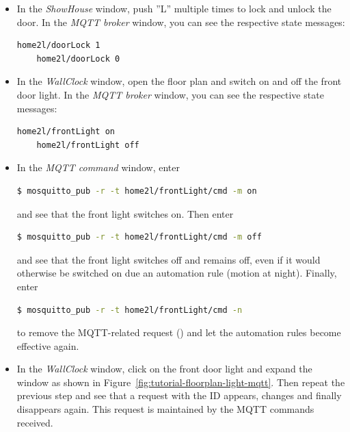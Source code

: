 \documentclass[12pt,english,parskip=half,headheight=19pt]{scrreprt}
\newcommand{\lst}[1]{\colorbox{lstbackground}{\footnotesize\code{#1}}}
\begin{document}
\begin{itemize}[$\blacktriangleright$]

\item
  In the \textit{ShowHouse} window, push ''L'' multiple times to lock and unlock the door.
  In the \textit{MQTT broker} window, you can see the respective state messages:
  \begin{lstlisting}[language=bash]
    home2l/doorLock 1
    home2l/doorLock 0
  \end{lstlisting}

\item
  In the \textit{WallClock} window, open the floor plan and switch on and off the front door light.
  In the \textit{MQTT broker} window, you can see the respective state messages:
  \begin{lstlisting}[language=bash]
    home2l/frontLight on
    home2l/frontLight off
  \end{lstlisting}

\item
  In the \textit{MQTT command} window, enter
  \begin{lstlisting}[language=bash]
    $ mosquitto_pub -r -t home2l/frontLight/cmd -m on
  \end{lstlisting}
  and see that the front light switches on. Then enter
  \begin{lstlisting}[language=bash]
    $ mosquitto_pub -r -t home2l/frontLight/cmd -m off
  \end{lstlisting}
  and see that the front light switches off and remains off, even if it would otherwise be switched on
  due an automation rule (motion at night).
  Finally, enter
  \begin{lstlisting}[language=bash]
    $ mosquitto_pub -r -t home2l/frontLight/cmd -n
  \end{lstlisting}
  to remove the MQTT-related request (\lst{#mqtt}) and let the automation rules become effective again.

\item
  In the \textit{WallClock} window, click on the front door light and expand the window
  as shown in Figure~\ref{fig:tutorial-floorplan-light-mqtt}. Then repeat the previous step and see
  that a request with the ID \lst{#mqtt} appears, changes and finally disappears again. This request
  is maintained by the MQTT commands received.

\end{itemize}
\end{document}
